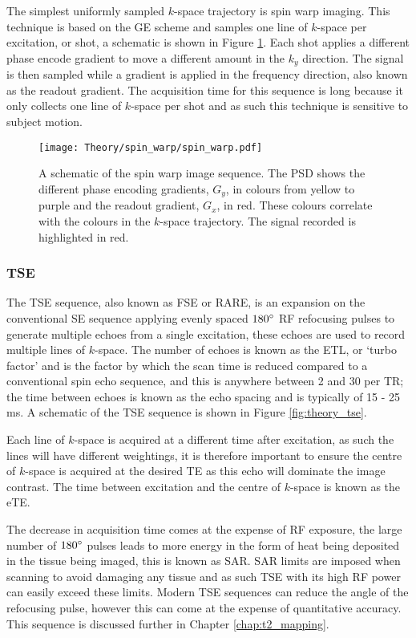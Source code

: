 The simplest uniformly sampled $k$-space trajectory is spin warp imaging. This technique is based on the \ac{GE} scheme and samples one line of $k$-space per excitation, or shot, a schematic is shown in Figure \ref{fig:theory_spin_warp}. Each shot applies a different phase encode gradient to move a different amount in the $k_y$ direction. The signal is then sampled while a gradient is applied in the frequency direction, also known as the readout gradient. The acquisition time for this sequence is long because it only collects one line of $k$-space per shot and as such this technique is sensitive to subject motion.

\begin{figure}[H]
	\centering
	\texttt{[image: Theory/spin\_warp/spin\_warp.pdf]}
	\caption{A schematic of the spin warp image sequence. The \ac*{PSD} shows the different phase encoding gradients, $G_y$, in colours from yellow to purple and the readout gradient, $G_x$, in red. These colours correlate with the colours in the $k$-space trajectory. The signal recorded is highlighted in red.}
	\label{fig:theory_spin_warp}	
\end{figure}

\subsubsection{\ac*{TSE}}
\label{subsubsec:theory_tse}
The \ac{TSE} sequence, also known as \ac{FSE} or \ac{RARE}, is an expansion on the conventional \ac{SE} sequence applying evenly spaced $180\degree${ }\ac{RF} refocusing pulses to generate multiple echoes from a single excitation, these echoes are used to record multiple lines of $k$-space. The number of echoes is known as the \ac{ETL}, or `turbo factor' and is the factor by which the scan time is reduced compared to a conventional spin echo sequence, and this is anywhere between 2 and 30 per \ac{TR}; the time between echoes is known as the echo spacing and is typically of 15 - 25 ms. A schematic of the \ac{TSE} sequence is shown in Figure \ref{fig:theory_tse}.

Each line of $k$-space is acquired at a different time after excitation, as such the lines will have different \ttwo weightings, it is therefore important to ensure the centre of $k$-space is acquired at the desired \ac{TE} as this echo will dominate the image contrast. The time between excitation and the centre of $k$-space is known as the \ac{eTE}.

The decrease in acquisition time comes at the expense of \ac{RF} exposure, the large number of $180\degree{ }$ pulses leads to more energy in the form of heat being deposited in the tissue being imaged, this is known as \ac{SAR}. \ac{SAR} limits are imposed when scanning to avoid damaging any tissue and as such \ac{TSE} with its high \ac{RF} power can easily exceed these limits. Modern \ac{TSE} sequences can reduce the angle of the refocusing pulse, however this can come at the expense of quantitative accuracy. This sequence is discussed further in Chapter \ref{chap:t2_mapping}.


